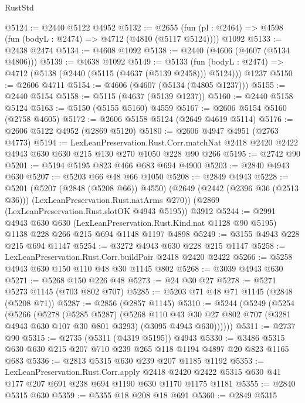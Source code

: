 \begin{lexlean}{RustStd}
\begin{coremodule}
{\begin{coremodule}
{{{{{{{{{{{{@5124 := @2440 @5122 @4952
@5132 := @2655
    (fun (pl : @2464) => @4598 (fun (bodyL : @2474) => @4712 (@4810 (@5117 @5124))))
    @1092
@5133 := @2438 @2474
@5134 := @4608 @1092
@5138 := @2440 (@4606 (@4607 (@5134 @4806)))
@5139 := @4638 @1092
@5149 := @5133
    (fun (bodyL : @2474) => @4712 (@5138 (@2440 (@5115 (@4637 (@5139 @2458))) @5124)))
    @1237
@5150 := @2606 @4711
@5154 := @4606 (@4607 (@5134 (@4805 @1237)))
@5155 := @2440 @5154
@5158 := @5115 (@4637 (@5139 @1237))
@5160 := @2440 @5158 @5124
@5163 := @5150 (@5155 @5160) @4559
@5167 := @2606 @5154 @5160 (@2758 @4605)
@5172 := @2606 @5158 @5124 (@2649 @4619 @5114)
@5176 := @2606 @5122 @4952 (@2869 @5120)
@5180 := @2606 @4947 @4951 (@2763 @4773)
@5194 := LexLeanPreservation.Rust.Corr.matchNat
    @2418
    @2420
    @2422
    @4943
    @630
    @630
    @215
    @130
    @270
    @1050
    @228
    @90
    @266
@5195 := @2742 @90
@5201 := @5194 @5195 @823 @466 @683 @694 @4900
@5203 := @2840 @4943 @630
@5207 := @5203 @66 @48 @66 @1050
@5208 := @2849 @4943
@5228 := @5201
    (@5207 (@2848 (@5208 @66)) @4550)
    (@2649 (@2442 (@2396 @36 (@2513 @36))) (LexLeanPreservation.Rust.natArms @270))
    (@2869 (LexLeanPreservation.Rust.slotOK @4943 @5195))
    @3912
@5244 := @2991
    @4943
    @630
    @630
    (LexLeanPreservation.Rust.Kind.nat @1128 @90 @5195)
    @1138
    @228
    @266
    @215
    @694
    @1148
    @1197
    @4898
@5249 := @3155 @4943 @228 @215 @694 @1147
@5254 := @3272 @4943 @630 @228 @215 @1147
@5258 := LexLeanPreservation.Rust.Corr.buildPair @2418 @2420 @2422
@5266 := @5258 @4943 @630 @150 @110 @48 @30 @1145 @802
@5268 := @3039 @4943 @630
@5271 := @5268 @150 @226 @48
@5273 := @24 @30 @27
@5278 := @5271 @5273 @1145 (@703 @802 @707)
@5285 := @5203 @71 @48 @71 @1145 (@2848 (@5208 @71))
@5287 := @2856 (@2857 @1145)
@5310 := @5244
    (@5249
      (@5254
        (@5266
          (@5278
            (@5285 @5287)
            (@5268
              @110
              @43
              @30
              @27
              @802
              @707
              (@3281 @4943 @630 @107 @30 @801 @3293)
              (@3095 @4943 @630))))))
@5311 := @2737 @90
@5315 := @2735 (@5311 (@4319 @5195)) @4943
@5330 := @3486 @5315 @630 @630 @215 @207 @710 @239 @265 @118 @1194 @4897 @20 @823 @1165 @683
@5336 := @2813 @5315 @630 @239 @207 @1185 @1192
@5353 := LexLeanPreservation.Rust.Corr.apply
    @2418
    @2420
    @2422
    @5315
    @630
    @41
    @177
    @207
    @691
    @238
    @694
    @1190
    @630
    @1170
    @1175
    @1181
@5355 := @2840 @5315 @630
@5359 := @5355 @18 @208 @18 @691
@5360 := @2849 @5315
}}}}}}}}}}}}
\end{coremodule}}
\end{coremodule}
\end{lexlean}
